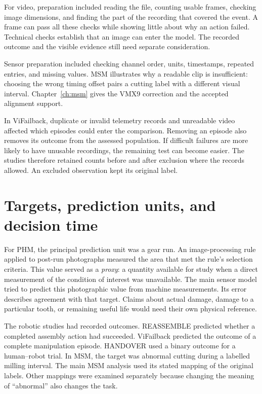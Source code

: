 For video, preparation included reading the file, counting usable frames, checking image
dimensions, and finding the part of the recording that covered the event. A frame can
pass all these checks while showing little about why an action failed. Technical checks
establish that an image can enter the model. The recorded outcome and the visible
evidence still need separate consideration.

Sensor preparation included checking channel order, units, timestamps, repeated entries,
and missing values. MSM illustrates why a readable clip is insufficient: choosing the
wrong timing offset pairs a cutting label with a different visual interval.
Chapter~\ref{ch:msm} gives the VMX9 correction and the accepted alignment support.

In ViFailback, duplicate or invalid telemetry records and unreadable video affected
which episodes could enter the comparison. Removing an episode also removes its outcome
from the assessed population. If difficult failures are more likely to have unusable
recordings, the remaining test can become easier. The studies therefore retained counts
before and after exclusion where the records allowed. An excluded observation kept its
original label.

\section{Targets, prediction units, and decision time}
\label{sec:ch4-targets}

For PHM, the principal prediction unit was a gear run. An image-processing rule applied
to post-run photographs measured the area that met the rule’s selection criteria. This
value served as a \emph{proxy}: a quantity available for study when a direct measurement
of the condition of interest was unavailable. The main sensor model tried to predict
this photographic value from machine measurements. Its error describes agreement with
that target. Claims about actual damage, damage to a particular tooth, or remaining
useful life would need their own physical reference.

The robotic studies had recorded outcomes. REASSEMBLE predicted whether a completed
assembly action had succeeded. ViFailback predicted the outcome of a complete
manipulation episode. HANDOVER used a binary outcome for a human–robot trial. In MSM,
the target was abnormal cutting during a labelled milling interval. The main MSM
analysis used its stated mapping of the original labels. Other mappings were examined
separately because changing the meaning of “abnormal” also changes the task.

